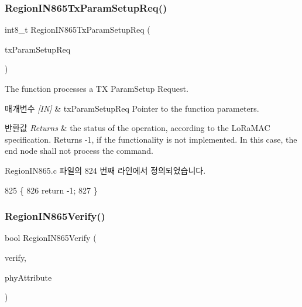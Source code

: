 \subsubsection{\texorpdfstring{Region\+I\+N865\+Tx\+Param\+Setup\+Req()}{RegionIN865TxParamSetupReq()}}
{\footnotesize\ttfamily int8\+\_\+t Region\+I\+N865\+Tx\+Param\+Setup\+Req (\begin{DoxyParamCaption}\item[{\mbox{\hyperlink{group___r_e_g_i_o_n_ga26836ef2996e70410e42ef471073f855}{Tx\+Param\+Setup\+Req\+Params\+\_\+t}} $\ast$}]{tx\+Param\+Setup\+Req }\end{DoxyParamCaption})}



The function processes a TX Param\+Setup Request. 


\begin{DoxyParams}{매개변수}
{\em \mbox{[}\+I\+N\mbox{]}} & tx\+Param\+Setup\+Req Pointer to the function parameters.\\
\hline
\end{DoxyParams}

\begin{DoxyRetVals}{반환값}
{\em Returns} & the status of the operation, according to the Lo\+Ra\+M\+AC specification. Returns -\/1, if the functionality is not implemented. In this case, the end node shall not process the command. \\
\hline
\end{DoxyRetVals}


Region\+I\+N865.\+c 파일의 824 번째 라인에서 정의되었습니다.


\begin{DoxyCode}
825 \{
826     \textcolor{keywordflow}{return} -1;
827 \}
\end{DoxyCode}
\mbox{\label{group___r_e_g_i_o_n_i_n865_ga1cc642ea1ceb59071532c10f0307981d}} 
\subsubsection{\texorpdfstring{Region\+I\+N865\+Verify()}{RegionIN865Verify()}}
{\footnotesize\ttfamily bool Region\+I\+N865\+Verify (\begin{DoxyParamCaption}\item[{\mbox{\hyperlink{group___r_e_g_i_o_n_ga966d97bc2f25df1c09e92e60ef652276}{Verify\+Params\+\_\+t}} $\ast$}]{verify,  }\item[{\mbox{\hyperlink{group___r_e_g_i_o_n_ga9445b07fdf77581ecfaf389970e635f8}{Phy\+Attribute\+\_\+t}}}]{phy\+Attribute }\end{DoxyParamCaption})}



